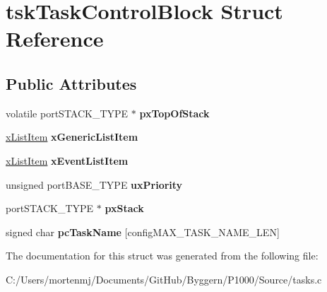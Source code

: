 \hypertarget{structtsk_task_control_block}{\section{tsk\-Task\-Control\-Block Struct Reference}
\label{structtsk_task_control_block}
}
\subsection*{Public Attributes}
\begin{DoxyCompactItemize}
\item 
\hypertarget{structtsk_task_control_block_afc326fefc205c0643b866b46422dad48}{volatile port\-S\-T\-A\-C\-K\-\_\-\-T\-Y\-P\-E $\ast$ {\bfseries px\-Top\-Of\-Stack}}\label{structtsk_task_control_block_afc326fefc205c0643b866b46422dad48}

\item 
\hypertarget{structtsk_task_control_block_a95eb5853a94644043605770f63ac9a63}{\hyperlink{structx_l_i_s_t___i_t_e_m}{x\-List\-Item} {\bfseries x\-Generic\-List\-Item}}\label{structtsk_task_control_block_a95eb5853a94644043605770f63ac9a63}

\item 
\hypertarget{structtsk_task_control_block_a9b0ee1554f116853c7631dc0b585ffdc}{\hyperlink{structx_l_i_s_t___i_t_e_m}{x\-List\-Item} {\bfseries x\-Event\-List\-Item}}\label{structtsk_task_control_block_a9b0ee1554f116853c7631dc0b585ffdc}

\item 
\hypertarget{structtsk_task_control_block_a82357f7be508ac5d27ae7968cddde6da}{unsigned port\-B\-A\-S\-E\-\_\-\-T\-Y\-P\-E {\bfseries ux\-Priority}}\label{structtsk_task_control_block_a82357f7be508ac5d27ae7968cddde6da}

\item 
\hypertarget{structtsk_task_control_block_a4586e39b121c224e22e0e84b04b8e3f3}{port\-S\-T\-A\-C\-K\-\_\-\-T\-Y\-P\-E $\ast$ {\bfseries px\-Stack}}\label{structtsk_task_control_block_a4586e39b121c224e22e0e84b04b8e3f3}

\item 
\hypertarget{structtsk_task_control_block_a11d2c88aa454db44eb0cb0184958a7b0}{signed char {\bfseries pc\-Task\-Name} \mbox{[}config\-M\-A\-X\-\_\-\-T\-A\-S\-K\-\_\-\-N\-A\-M\-E\-\_\-\-L\-E\-N\mbox{]}}\label{structtsk_task_control_block_a11d2c88aa454db44eb0cb0184958a7b0}

\end{DoxyCompactItemize}


The documentation for this struct was generated from the following file\-:\begin{DoxyCompactItemize}
\item 
C\-:/\-Users/mortenmj/\-Documents/\-Git\-Hub/\-Byggern/\-P1000/\-Source/tasks.\-c\end{DoxyCompactItemize}
